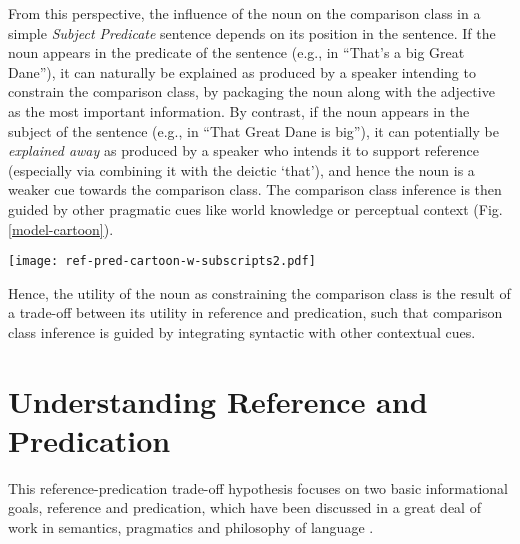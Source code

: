 From this perspective, the influence of the noun on the comparison class in a simple \textit{Subject Predicate} sentence depends on its position in the sentence. If the noun appears in the predicate of the sentence (e.g., in “That’s a big Great Dane”), it can naturally be explained as produced by a speaker intending to constrain the comparison class, by packaging the noun along with the adjective as the most important information. By contrast, if the noun appears in the subject of the sentence (e.g., in “That Great Dane is big”), it can potentially be \emph{explained away} as produced by a speaker who intends it to support reference (especially via combining it with the deictic ‘that’), and hence the noun is a weaker cue towards the comparison class. The comparison class inference is then guided by other pragmatic cues like world knowledge or perceptual context (Fig. \ref{model-cartoon}).

\begin{figure*}[t]
	\begin{center}
		\texttt{[image: ref-pred-cartoon-w-subscripts2.pdf]}
	\end{center}
	\caption{Cartoon of the inferential account for comparison class determination. The noun (Great Dane) in a sentence can be employed either for the goal of reference (green) or predication (purple), shown in the case when this distinction is made via the syntactic position of the noun (subject S~vs.~predicate P). When the noun is used for reference (top), a listener is left with uncertainty about what to use as the comparison class (dogs or Great Danes) and integrates their world knowledge and the physical context to make this inference.  When the noun is used for predication (bottom), the listener should have less uncertainty about the comparison class: The comparison class is stipulated by the noun.}
	\label{model-cartoon}
\end{figure*}
 
Hence, the utility of the noun as constraining the comparison class is the result of a trade-off between its utility in reference and predication, such that comparison class inference is guided by integrating syntactic with other contextual cues.

\section{Understanding Reference and Predication}
This reference-predication trade-off hypothesis focuses on two basic informational goals, reference and predication, which have been discussed in a great deal of work in semantics, pragmatics and philosophy of language \parencite{michaelson2019, Reboul2001}.
 
